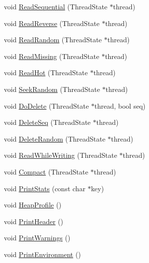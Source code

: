 \begin{DoxyCompactItemize}
\item 
void \hyperlink{classleveldb_1_1_benchmark_ace2f012f8ce6e279f900045c94934d7a}{Read\-Sequential} (Thread\-State $\ast$thread)
\item 
void \hyperlink{classleveldb_1_1_benchmark_a0ff7ac14f7503672fd09a23f8cb9c171}{Read\-Reverse} (Thread\-State $\ast$thread)
\item 
void \hyperlink{classleveldb_1_1_benchmark_abef1498fff747eb738dd8d6ab438d3f7}{Read\-Random} (Thread\-State $\ast$thread)
\item 
void \hyperlink{classleveldb_1_1_benchmark_a03029862416a43d2e8c25b8615ba83a2}{Read\-Missing} (Thread\-State $\ast$thread)
\item 
void \hyperlink{classleveldb_1_1_benchmark_a2a3d0a13c1d410071a0a324cf3c57603}{Read\-Hot} (Thread\-State $\ast$thread)
\item 
void \hyperlink{classleveldb_1_1_benchmark_ab81f03204b210d1a3565fa0c8b81a9c8}{Seek\-Random} (Thread\-State $\ast$thread)
\item 
void \hyperlink{classleveldb_1_1_benchmark_a987ec13830ab5ac11f152b23c6bddc95}{Do\-Delete} (Thread\-State $\ast$thread, bool seq)
\item 
void \hyperlink{classleveldb_1_1_benchmark_a56edb0a3157cbc6c4d53b7c2bba7500d}{Delete\-Seq} (Thread\-State $\ast$thread)
\item 
void \hyperlink{classleveldb_1_1_benchmark_a3c8a9018862c652e48830cdb38269060}{Delete\-Random} (Thread\-State $\ast$thread)
\item 
void \hyperlink{classleveldb_1_1_benchmark_a8373efcda4c0e141343b5ee9182df17e}{Read\-While\-Writing} (Thread\-State $\ast$thread)
\item 
void \hyperlink{classleveldb_1_1_benchmark_a4038073777f89d101a0ab308eaa2d1fc}{Compact} (Thread\-State $\ast$thread)
\item 
void \hyperlink{classleveldb_1_1_benchmark_a9588df1fc4ab1247a2bacb4a2c641f35}{Print\-Stats} (const char $\ast$key)
\item 
void \hyperlink{classleveldb_1_1_benchmark_aa7050ec2b08b3a47315a6d2d969b5119}{Heap\-Profile} ()
\item 
void \hyperlink{classleveldb_1_1_benchmark_a15b286cc29560860abc89217e4b5c079}{Print\-Header} ()
\item 
void \hyperlink{classleveldb_1_1_benchmark_aa0b2a30493347ff50cbf28772cfaca9d}{Print\-Warnings} ()
\item 
void \hyperlink{classleveldb_1_1_benchmark_ac99c8911fbe6bc43acd785cf28d3f5a7}{Print\-Environment} ()

\end{DoxyCompactItemize}
